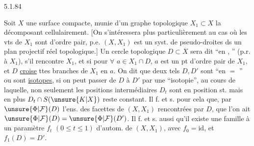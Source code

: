 5.1.84

Soit $X$ une surface compacte, munie
d'un graphe topologique $X_1\subset X$ la
décomposant cellulairement. [On s'intéressera
plus particulièrement au cas où
 les vts de $X_1$ sont d'ordre pair, p.e.
$(X,X_1)$ est un syst. de pseudo-droites
ds un plan  projectif réel topologique.]
 Un cercle topologique $D\subset X$ sera dit
``en , '' (p.r. à $X_1$), s'il
 rencontre $X_1$, et si pour $\forall$
$a\in X_1\cap D$,  $a$ est un
pt d'ordre pair de $X_1$, et $D$ \uline{croise} ttes
branches de $X_1$ en $a$. On dit que deux
tels $D,D'$ sont ``en $=$ ''
ou sont \uline{isotopes}, si on peut passer
de $D$ à $D'$ par une ``isotopie'', au cours
de laquelle, non seulement les positions
intermédiaires $D_t$ sont en position st.
mais en plus $D_t\cap S(\unsure{K|X})$ reste constant.
Il f. et s. pour cela que,   par
$\unsure{\Phi|\mathcal F}(D)$ l'ens. des facettes de $(X,X_1)$ rencontrées
par $D$, que l'on ait $\unsure{\Phi|\mathcal F}(D)=\unsure{\Phi|\mathcal F}(D')$. Il f. et s.
aussi qu'il existe une famille à un
paramètre $f_t$ $(0\leq t\leq1)$ d'autom. de
$(X,X_1)$, avec $f_0=\mathrm{id}$, et $f_1(D)=D'$.

